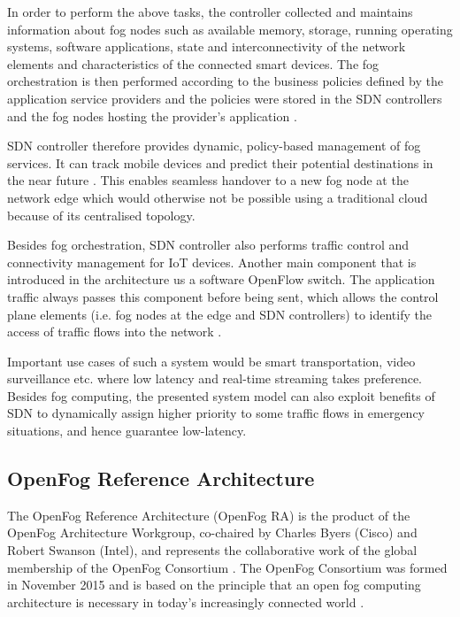 \documentclass{article}
\begin{document}
In order to perform the above tasks, the controller collected and maintains information about fog nodes such as available memory, storage, running operating systems, software applications, state and interconnectivity of the network elements and characteristics of the connected smart devices.
The fog orchestration is then performed according to the business policies defined by the application service providers and the policies were stored in the SDN controllers and the fog nodes hosting the provider's application \cite{tomovic2017software}.

SDN controller therefore provides dynamic, policy-based management of fog services. It can track mobile devices and predict their potential destinations in the near future \cite{tomovic2017software}. This enables seamless handover to a new fog node at the network edge which would otherwise not be possible using a traditional cloud because of its centralised topology.

Besides fog orchestration, SDN controller also performs traffic control and connectivity management for IoT devices.
Another main component that is introduced in the architecture us a software OpenFlow switch. 
The application traffic always passes this component before being sent, which allows the control plane elements (i.e. fog nodes at the edge and SDN controllers) to identify the access of traffic flows into the network \cite{tomovic2017software}. 

Important use cases of such a system would be smart transportation, video surveillance etc. where low latency and real-time streaming takes preference. Besides fog computing, the presented system model can also exploit benefits of SDN to dynamically assign higher priority to some traffic flows in emergency situations, and hence guarantee low-latency.

\subsection{OpenFog Reference Architecture}

The OpenFog Reference Architecture (OpenFog RA) is the product of the OpenFog Architecture Workgroup, co-chaired by Charles Byers (Cisco) and Robert Swanson (Intel), and represents the collaborative work of the global membership of the OpenFog Consortium \cite{openfogconsortium2017}. The OpenFog Consortium was formed in November 2015 and is based on the principle that an open fog computing architecture is necessary in today’s increasingly connected world \cite{openfogconsortium2017}.
\end{document}
